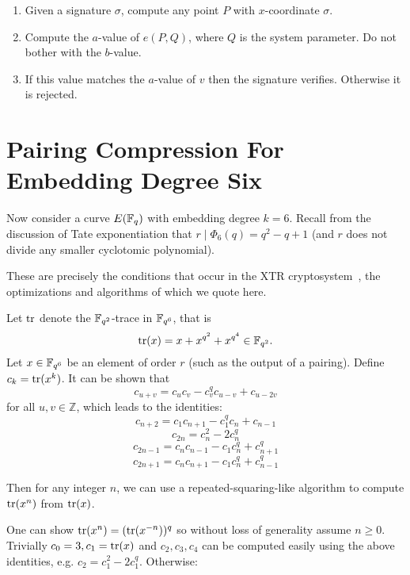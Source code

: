 \begin{enumerate}
\item
Given a signature $\sigma$, compute any point $P$ with $x$-coordinate $\sigma$.
\item
Compute the $a$-value of $e(P,Q)$, where $Q$ is the system parameter.
Do not bother with the $b$-value.
\item
If this value matches the $a$-value of $v$ then the signature verifies.
Otherwise it is rejected.
\end{enumerate}

\section {Pairing Compression For Embedding Degree Six}

Now consider a curve $E(\mathbb{F}_q)$ with embedding degree $k=6$.
Recall from the discussion of Tate exponentiation that
$r \mid \Phi_6(q) = q^2 - q + 1$ (and $r$ does not divide any
smaller cyclotomic polynomial).

These are precisely the conditions
that occur in the XTR cryptosystem~\cite{xtr}, the
optimizations and algorithms of which we quote here.

Let $\mathop{\rm tr}$ denote the $\mathbb{F}_{q^2}$-trace in $\mathbb{F}_{q^6}$,
that is
\[ \mathop{\rm tr}(x) = x + x^{q^2} + x^{q^4}  \in \mathbb{F}_{q^2} .\]
Let $x \in \mathbb{F}_{q^6}$ be an element of order $r$ (such as the output of
a pairing).
Define $c_k = \mathop{\rm tr}(x^k)$.
It can be shown that
\[ c_{u+v} = c_u c_v - c_v^q c_{u-v} + c_{u-2v} \]
for all $u,v\in\mathbb{Z}$,
which leads to the identities:
\[ c_{n+2} = c_1 c_{n+1} - c_1^q c_n + c_{n-1} \]
\[ c_{2n} = c_n^2 - 2c_n^q \]
\[ c_{2n-1} = c_n c_{n-1} - c_1 c_n^q + c_{n+1}^q \]
\[ c_{2n+1} = c_n c_{n+1} - c_1 c_n^q + c_{n-1}^q \]

Then for any integer $n$,
we can use a repeated-squaring-like algorithm
to compute $\mathop{\rm tr}(x^n)$ from $\mathop{\rm tr}(x)$.

One can show $\mathop{\rm tr} (x^n) = (\mathop{\rm tr}(x^{-n}))^q$ so
without loss of generality assume $n \ge 0$.
Trivially $c_0 = 3, c_1 = \mathop{\rm tr}(x)$
and $c_2, c_3, c_4$ can be computed easily
using the above identities, e.g. $c_2 = c_1^2 - 2c_1^q$.
Otherwise:


